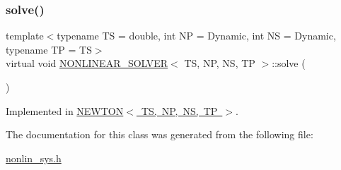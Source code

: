 \subsubsection{\texorpdfstring{solve()}{solve()}}
{\footnotesize\ttfamily template$<$typename TS  = double, int NP = Dynamic, int NS = Dynamic, typename TP  = TS$>$ \\
virtual void \mbox{\hyperlink{class_n_o_n_l_i_n_e_a_r___s_o_l_v_e_r}{N\+O\+N\+L\+I\+N\+E\+A\+R\+\_\+\+S\+O\+L\+V\+ER}}$<$ TS, NP, NS, TP $>$\+::solve (\begin{DoxyParamCaption}\item[{\mbox{\hyperlink{class_n_o_n_l_i_n_e_a_r___s_y_s_t_e_m}{N\+O\+N\+L\+I\+N\+E\+A\+R\+\_\+\+S\+Y\+S\+T\+EM}}$<$ TS, NP, NS, TP $>$ \&}]{ }\end{DoxyParamCaption})\hspace{0.3cm}{\ttfamily [pure virtual]}}



Implemented in \mbox{\hyperlink{class_n_e_w_t_o_n_a1dd31b882567d3e0427eb53ce169f0ce}{N\+E\+W\+T\+O\+N$<$ T\+S, N\+P, N\+S, T\+P $>$}}.



The documentation for this class was generated from the following file\+:\begin{DoxyCompactItemize}
\item 
\mbox{\hyperlink{nonlin__sys_8h}{nonlin\+\_\+sys.\+h}}\end{DoxyCompactItemize}
